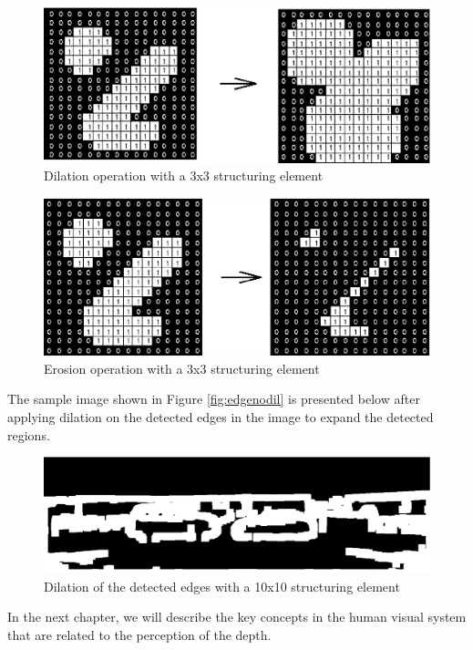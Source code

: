 \begin{figure}[H]
\centering
\includegraphics[scale=0.8]{diltbin}
\caption{Dilation operation with a 3x3 structuring element \cite{HIPRdil}}
\label{fig:dilate}
\end{figure} 

\begin{figure}[H]
\centering
\includegraphics[scale=0.8]{erodbin}
\caption{Erosion operation with a 3x3 structuring element \cite{HIPRerod}}
\label{fig:erode}
\end{figure} 
The sample image shown in Figure \ref{fig:edgenodil} is presented below after applying dilation on the detected edges in the image to expand the 
detected regions.

\begin{figure}[H]
\centering
\includegraphics[scale=0.35]{mask5dil}
\caption{Dilation of the detected edges with a 10x10 structuring element}
\label{fig:edgedil}
\end{figure}

In the next chapter, we will describe the key concepts in the human visual system that are related to the perception of the depth.

